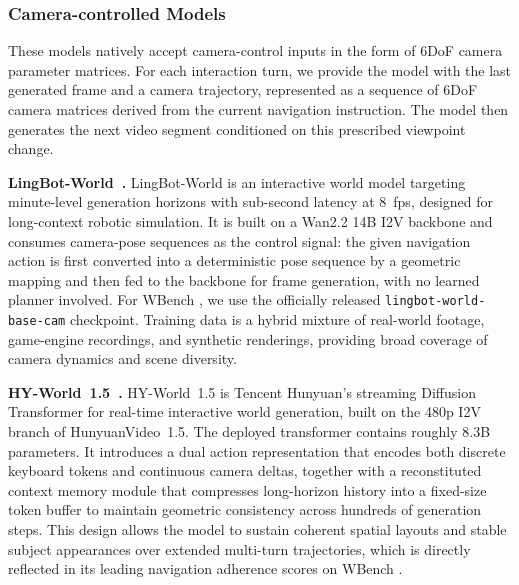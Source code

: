 \documentclass{llmxive}
\providecommand{\myparagraph}[1]{\vspace{-0.1em}\noindent\textbf{#1}\hspace{0.3em}}
\providecommand{\benchmark}{WBench }
\begin{document}
\subsubsection{Camera-controlled Models}

These models natively accept camera-control inputs in the form of 6DoF camera parameter matrices.
For each interaction turn, we provide the model with the last generated frame and a camera trajectory, represented as a sequence of 6DoF camera matrices derived from the current navigation instruction.
The model then generates the next video segment conditioned on this prescribed viewpoint change.

\myparagraph{LingBot-World~\cite{gao2026lingbot}.}
LingBot-World is an interactive world model targeting minute-level generation horizons with sub-second latency at 8~fps, designed for long-context robotic simulation.
It is built on a Wan2.2 14B I2V backbone and consumes camera-pose sequences as the control signal: the given navigation action is first converted into a deterministic pose sequence by a geometric mapping and then fed to the backbone for frame generation, with no learned planner involved.
For \benchmark, we use the officially released \texttt{lingbot-world-base-cam} checkpoint.
Training data is a hybrid mixture of real-world footage, game-engine recordings, and synthetic renderings, providing broad coverage of camera dynamics and scene diversity.

\myparagraph{HY-World~1.5~\cite{sun2025hyworldplay}.}
HY-World~1.5 is Tencent Hunyuan's streaming Diffusion Transformer for real-time interactive world generation, built on the 480p I2V branch of HunyuanVideo~1.5.
The deployed transformer contains roughly $8.3$B parameters.
It introduces a dual action representation that encodes both discrete keyboard tokens and continuous camera deltas, together with a reconstituted context memory module that compresses long-horizon history into a fixed-size token buffer to maintain geometric consistency across hundreds of generation steps.
This design allows the model to sustain coherent spatial layouts and stable subject appearances over extended multi-turn trajectories, which is directly reflected in its leading navigation adherence scores on \benchmark.
\end{document}
